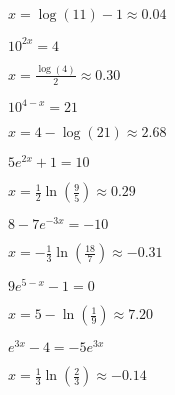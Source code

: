 \begin{exercises}
\begin{problem}
\begin{multicols}{4}
\begin{subproblem}
\begin{shortsolution}
			$x=\log(11)-1\approx 0.04$
		\end{shortsolution}
	\end{subproblem}
	\begin{subproblem}
		$10^{2x}=4$ 
		\begin{shortsolution}
			$x=\frac{\log(4)}{2}\approx 0.30$
		\end{shortsolution}
	\end{subproblem}
	\begin{subproblem}
		$10^{4-x}=21$ 
		\begin{shortsolution}
			$x=4-\log(21)\approx 2.68$
		\end{shortsolution}
	\end{subproblem}
	\begin{subproblem}
		$5e^{2x}+1=10$ 
		\begin{shortsolution}
			$x=\frac{1}{2}\ln\left( \frac{9}{5} \right)\approx 0.29$
		\end{shortsolution}
	\end{subproblem}
	\begin{subproblem}
		$8-7e^{-3x}=-10$ 
		\begin{shortsolution}
			$x=-\frac{1}{3}\ln\left( \frac{18}{7} \right)\approx -0.31$
		\end{shortsolution}
	\end{subproblem}
	\begin{subproblem}
		$9e^{5-x}-1=0$ 
		\begin{shortsolution}
			$x=5-\ln\left( \frac{1}{9} \right)\approx 7.20$
		\end{shortsolution}
	\end{subproblem}
	\begin{subproblem}
		$e^{3x}-4=-5e^{3x}$ 
		\begin{shortsolution}
			$x=\frac{1}{3}\ln\left( \frac{2}{3} \right)\approx -0.14$
		\end{shortsolution}
	\end{subproblem}
\end{multicols}
\end{problem}


\end{exercises}
